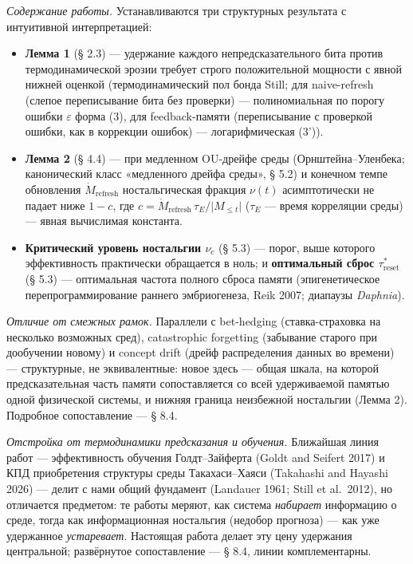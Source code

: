 \documentclass[pdflatex,sn-mathphys-ay]{sn-jnl}
\providecommand{\tightlist}{\setlength{\itemsep}{0pt}\setlength{\parskip}{0pt}}
\begin{document}
\emph{Содержание работы.} Устанавливаются три структурных результата с интуитивной интерпретацией:



\begin{itemize}

\tightlist

\item

  \textbf{Лемма 1} (§ 2.3) --- удержание каждого непредсказательного бита против термодинамической эрозии требует строго положительной мощности с явной нижней оценкой (термодинамический пол бонда Still; для naive-refresh (слепое переписывание бита без проверки) --- полиномиальная по порогу ошибки \(\varepsilon\) форма (3), для feedback-памяти (переписывание с проверкой ошибки, как в коррекции ошибок) --- логарифмическая (3')).

\item

  \textbf{Лемма 2} (§ 4.4) --- при медленном OU-дрейфе среды (Орнштейна--Уленбека; канонический класс «медленного дрейфа среды», § 5.2) и конечном темпе обновления \(\dot M_{\text{refresh}}\) ностальгическая фракция \(\nu(t)\) асимптотически не падает ниже \(1 - c\), где \(c = \dot M_{\text{refresh}}\, \tau_E / \lvert M_{\le t}\rvert\) (\(\tau_E\) --- время корреляции среды) --- явная вычислимая константа.

\item

  \textbf{Критический уровень ностальгии \(\nu_c\)} (§ 5.3) --- порог, выше которого эффективность практически обращается в ноль; и \textbf{оптимальный сброс \(\tau_{\text{reset}}^*\)} (§ 5.3) --- оптимальная частота полного сброса памяти (эпигенетическое перепрограммирование раннего эмбриогенеза, Reik 2007; диапаузы \emph{Daphnia}).

\end{itemize}



\emph{Отличие от смежных рамок.} Параллели с bet-hedging (ставка-страховка на несколько возможных сред), catastrophic forgetting (забывание старого при дообучении новому) и concept drift (дрейф распределения данных во времени) --- структурные, не эквивалентные: новое здесь --- общая шкала, на которой предсказательная часть памяти сопоставляется со всей удерживаемой памятью одной физической системы, и нижняя граница неизбежной ностальгии (Лемма 2). Подробное сопоставление --- § 8.4.



\emph{Отстройка от термодинамики предсказания и обучения.} Ближайшая линия работ --- эффективность обучения Голдт--Зайферта (Goldt and Seifert 2017) и КПД приобретения структуры среды Такахаси--Хаяси (Takahashi and Hayashi 2026) --- делит с нами общий фундамент (Landauer 1961; Still et al.~2012), но отличается предметом: те работы меряют, как система \emph{набирает} информацию о среде, тогда как информационная ностальгия (недобор прогноза) --- как уже удержанное \emph{устаревает}. Настоящая работа делает эту цену удержания центральной; развёрнутое сопоставление --- § 8.4, линии комплементарны.
\end{document}
